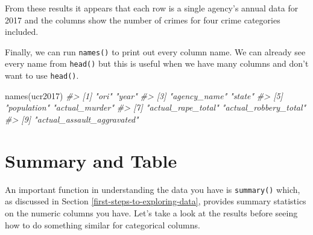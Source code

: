 \documentclass[
]{krantz}
\makeatletter
\newenvironment{Shaded}{\begin{snugshade}}{\end{snugshade}}
\newcommand{\CommentTok}[1]{\textcolor[rgb]{0.37,0.37,0.37}{\textit{#1}}}
\newcommand{\FunctionTok}[1]{\textcolor[rgb]{0,0,0}{#1}}
\newcommand{\NormalTok}[1]{#1}
\newenvironment{kframe}{%
\medskip{}
\setlength{\fboxsep}{.8em}
 \def\at@end@of@kframe{}%
 \ifinner\ifhmode%
  \def\at@end@of@kframe{\end{minipage}}%
  \begin{minipage}{\columnwidth}%
 \fi\fi%
 \def\FrameCommand##1{\hskip\@totalleftmargin \hskip-\fboxsep
 \colorbox{shadecolor}{##1}\hskip-\fboxsep
     \hskip-\linewidth \hskip-\@totalleftmargin \hskip\columnwidth}%
 \MakeFramed {\advance\hsize-\width
   \@totalleftmargin\z@ \linewidth\hsize
   \@setminipage}}%
 {\par\unskip\endMakeFramed%
 \at@end@of@kframe}
\renewenvironment{Shaded}{\begin{kframe}}{\end{kframe}}
\makeatother
\begin{document}
From these results it appears that each row is a single agency's annual data for 2017 and the columns show the number of crimes for four crime categories included.

Finally, we can run \texttt{names()} to print out every column name. We can already see every name from \texttt{head()} but this is useful when we have many columns and don't want to use \texttt{head()}.

\begin{Shaded}
\begin{Highlighting}[]
\FunctionTok{names}\NormalTok{(ucr2017)}
\CommentTok{\#\textgreater{} [1] "ori"                       "year"                     }
\CommentTok{\#\textgreater{} [3] "agency\_name"               "state"                    }
\CommentTok{\#\textgreater{} [5] "population"                "actual\_murder"            }
\CommentTok{\#\textgreater{} [7] "actual\_rape\_total"         "actual\_robbery\_total"     }
\CommentTok{\#\textgreater{} [9] "actual\_assault\_aggravated"}
\end{Highlighting}
\end{Shaded}

\hypertarget{summary-and-table}{%
\section{Summary and Table}\label{summary-and-table}}

An important function in understanding the data you have is \texttt{summary()} which, as discussed in Section \ref{first-steps-to-exploring-data}, provides summary statistics on the numeric columns you have. Let's take a look at the results before seeing how to do something similar for categorical columns.
\end{document}
